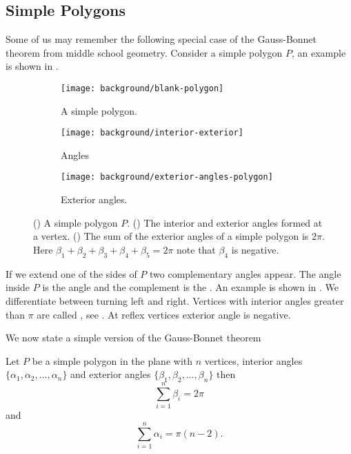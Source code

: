 \subsection{Simple Polygons}
\label{sec:warm-up}

Some of us may remember the following special case
of the Gauss-Bonnet theorem from middle school geometry.
Consider a simple polygon $P$, an example is shown in .

 \begin{figure}[htb]
         \centering
          \begin{subfigure}[b]{0.30\textwidth}
      		   \texttt{[image: background/blank-polygon]}
    		    \caption{A simple polygon.}
 		 \label{fig:polygon}
	 \end{subfigure}
	 \hspace{.5cm}
	 \begin{subfigure}[b]{0.25\textwidth}
       		  \texttt{[image: background/interior-exterior]}
     		    \caption{Angles}
 		 \label{fig:interior-exterior}
       \end{subfigure}
        \hspace{.5cm}
     \begin{subfigure}[b]{0.27\textwidth}
       		  \texttt{[image: background/exterior-angles-polygon]}
       		  \caption{Exterior angles.}
       		   \label{fig:exterior-angles}
         \end{subfigure}
		\caption{() A simple polygon $P.$
		() The interior and exterior angles formed at a vertex.
 		 () The sum of the exterior angles of a simple
		polygon is $2\pi$. Here
		$\beta_1+\beta_2+\beta_3+\beta_4+\beta_5=2\pi$ note that $\beta_4$ is negative.
 		\label{fig:simple-polygon}}
 \end{figure}

If we extend one of the sides of $P$ two complementary angles appear.
The angle inside $P$ is the  angle and the complement 
is the  . An example is shown in .
We differentiate between turning left and right.
Vertices with interior angles  greater than $\pi$ are called , see . 
At reflex vertices exterior angle is negative.



We now state a simple version of the Gauss-Bonnet theorem

\begin{theorem}\label{thm:simple-bonnet}
Let $P$ be a simple polygon in the plane with $n$  vertices,
interior angles $\{\alpha_1,\alpha_2,\ldots,\alpha_n\}$
and exterior angles $\{\beta_1,\beta_2,\ldots,\beta_n\}$ then
$$\sum_{i=1}^n\beta_i=2\pi$$
and 
$$\sum_{i=1}^n\alpha_i=\pi(n-2).$$
\end{theorem}



